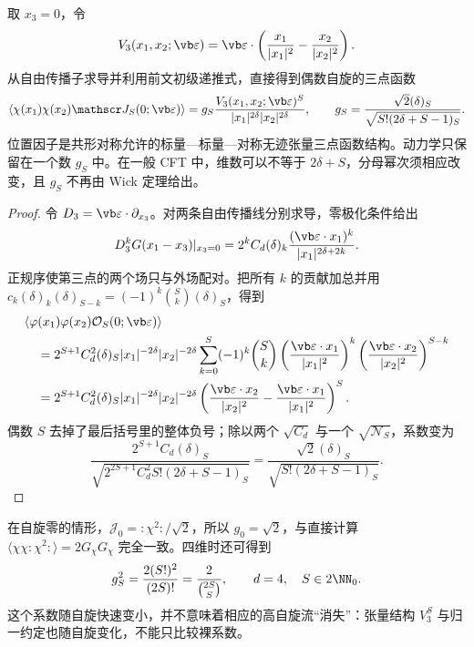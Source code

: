 取 $x_3=0$，令
\begin{equation}\label{eq:ghs-threepoint-polarization-invariant}
 V_3(x_1,x_2;\vb\varepsilon)
 =\vb\varepsilon\cdot\left(\frac{x_1}{|x_1|^2}-\frac{x_2}{|x_2|^2}\right).
\end{equation}
从自由传播子求导并利用前文初级递推式，直接得到偶数自旋的三点函数
\begin{equation}\label{eq:ghs-scalar-scalar-spin-3pt}
 \langle\chi(x_1)\chi(x_2)\mathscr J_S(0;\vb\varepsilon)\rangle
 =g_S\frac{V_3(x_1,x_2;\vb\varepsilon)^S}
 {|x_1|^{2\delta}|x_2|^{2\delta}},
 \qquad
 g_S=\frac{\sqrt2(\delta)_S}{\sqrt{S!(2\delta+S-1)_S}}.
\end{equation}
位置因子是共形对称允许的标量—标量—对称无迹张量三点函数结构。动力学只保留在一个数 $g_S$ 中。在一般 CFT 中，维数可以不等于 $2\delta+S$，分母幂次须相应改变，且 $g_S$ 不再由 Wick 定理给出。


\begin{proof}
令 $D_3=\vb\varepsilon\cdot\partial_{x_3}$。对两条自由传播线分别求导，零极化条件给出
\begin{equation*}
D_3^kG(x_1-x_3)|_{x_3=0}
=2^k C_d(\delta)_k
\frac{(\vb\varepsilon\cdot x_1)^k}{|x_1|^{2\delta+2k}}.
\end{equation*}
正规序使第三点的两个场只与外场配对。把所有 $k$ 的贡献加总并用 $c_k(\delta)_k(\delta)_{S-k}=(-1)^k\binom Sk(\delta)_S$，得到
\begin{align*}
&\langle\varphi(x_1)\varphi(x_2)\mathcal O_S(0;\vb\varepsilon)\rangle\\
&\quad=2^{S+1}C_d^2(\delta)_S
|x_1|^{-2\delta}|x_2|^{-2\delta}
\sum_{k=0}^S(-1)^k\binom Sk
\left(\frac{\vb\varepsilon\cdot x_1}{|x_1|^2}\right)^k
\left(\frac{\vb\varepsilon\cdot x_2}{|x_2|^2}\right)^{S-k}\\
&\quad=2^{S+1}C_d^2(\delta)_S
|x_1|^{-2\delta}|x_2|^{-2\delta}
\left(\frac{\vb\varepsilon\cdot x_2}{|x_2|^2}
-\frac{\vb\varepsilon\cdot x_1}{|x_1|^2}\right)^S.
\end{align*}
偶数 $S$ 去掉了最后括号里的整体负号；除以两个 $\sqrt{C_d}$ 与一个 $\sqrt{\mathcal N_S}$，系数变为
\begin{equation*}
\frac{2^{S+1}C_d(\delta)_S}{\sqrt{2^{2S+1}C_d^2S!(2\delta+S-1)_S}}
=\frac{\sqrt2(\delta)_S}{\sqrt{S!(2\delta+S-1)_S}}.
\end{equation*}
\end{proof}

在自旋零的情形，$\mathscr J_0=:\!\chi^2\!:/\sqrt2$，所以 $g_0=\sqrt2$，与直接计算 $\langle\chi\chi:\!\chi^2\!:\rangle=2G_\chi G_\chi$ 完全一致。四维时还可得到
\begin{equation}\label{eq:ghs-threepoint-four-d}
 g_S^2=\frac{2(S!)^2}{(2S)!}
 =\frac2{\binom{2S}{S}},\qquad d=4,\quad S\in2\NN_0.
\end{equation}
这个系数随自旋快速变小，并不意味着相应的高自旋流“消失”：张量结构 $V_3^S$ 与归一约定也随自旋变化，不能只比较裸系数。


